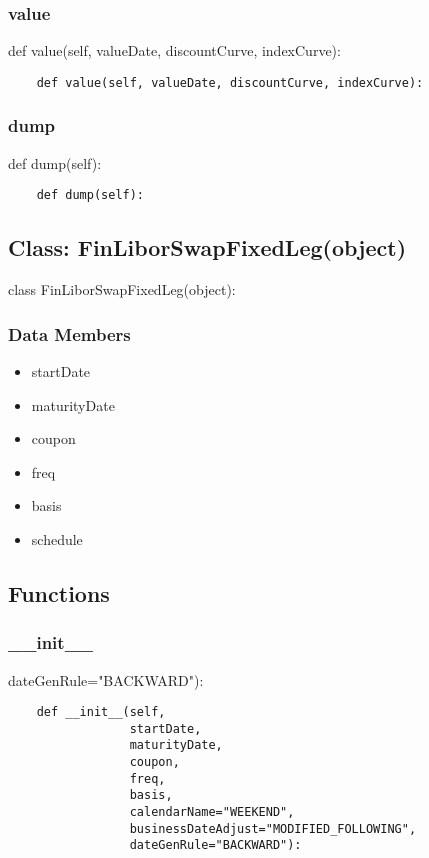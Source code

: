 \documentclass[twoside,11pt]{book}
\begin{document}
\subsubsection*{{\bf value}}
def value(self, valueDate, discountCurve, indexCurve): 

\begin{lstlisting}
    def value(self, valueDate, discountCurve, indexCurve):
\end{lstlisting}

\subsubsection*{{\bf dump}}
def dump(self): 

\begin{lstlisting}
    def dump(self):
\end{lstlisting}

\subsection*{Class: FinLiborSwapFixedLeg(object)}
class FinLiborSwapFixedLeg(object): 

\subsubsection*{Data Members}
\begin{itemize}
\item{startDate}
\item{maturityDate}
\item{coupon}
\item{freq}
\item{basis}
\item{schedule}
\end{itemize}

\subsection*{Functions}

\subsubsection*{{\bf \_\_init\_\_}}
dateGenRule="BACKWARD"): 

\begin{lstlisting}
    def __init__(self,
                 startDate,
                 maturityDate,
                 coupon,
                 freq,
                 basis,
                 calendarName="WEEKEND",
                 businessDateAdjust="MODIFIED_FOLLOWING",
                 dateGenRule="BACKWARD"):
\end{lstlisting}
\end{document}
